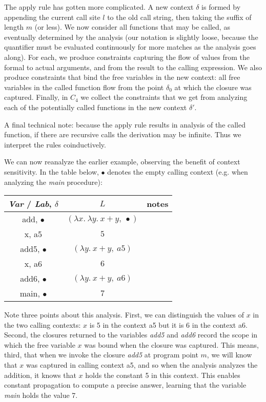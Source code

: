\documentclass[11pt]{article}
\def\tablespace{\vspace{2ex}}
\newcommand{\todo}[1]{}
\begin{document}
The apply rule has gotten more complicated.  A new context $\delta$ is formed by appending the current call site $l$ to the old call string, then taking the suffix of length $m$ (or less).  We now consider all functions that may be called, as eventually determined by the analysis (our notation is slightly loose, because the quantifier must be evaluated continuously for more matches as the analysis goes along).  For each, we produce constraints capturing the flow of values from the formal to actual arguments, and from the result to the calling expression.  We also produce constraints that bind the free variables in the new context: all free variables in the called function flow from the point $\delta_0$ at which the closure was captured.  Finally, in $C_4$ we collect the constraints that we get from analyzing each of the potentially called functions in the new context $\delta'$.

A final technical note: because the apply rule results in analysis of the called function, if there are recursive calls the derivation may be infinite.  Thus we interpret the rules coinductively.

\todo{explain this better, by example, next year}

We can now reanalyze the earlier example, observing the benefit of context sensitivity.  In the table below, $\bullet$ denotes the empty calling context (e.g. when analyzing the \textit{main} procedure):

\tablespace
\begin{tabular}{c | c | l}

\textit{Var} / \textit{Lab}, $\delta$ & $L$ & notes \\
\hline
add, $\bullet$  & $(\lambda x .~ \lambda y .~ x + y,~ \bullet)$ \\
x, a5           & $5$ \\
add5, $\bullet$ & $(\lambda y .~ x + y,~a5)$ \\
x, a6           & $6$ \\
add6, $\bullet$ & $(\lambda y .~ x + y,~a6)$ \\
main, $\bullet$ & $7$ \\

\end{tabular}
\tablespace

Note three points about this analysis.  First, we can distinguish the values of $x$ in the two calling contexts: $x$ is 5 in the context a5 but it is 6 in the context a6.  Second, the closures returned to the variables \textit{add5} and \textit{add6} record the scope in which the free variable $x$ was bound when the closure was captured.  This means, third, that when we invoke the closure \textit{add5} at program point $m$, we will know that $x$ was captured in calling context a5, and so when the analysis analyzes the addition, it knows that $x$ holds the constant 5 in this context.  This enables constant propagation to compute a precise answer, learning that the variable \textit{main} holds the value 7.
\end{document}
